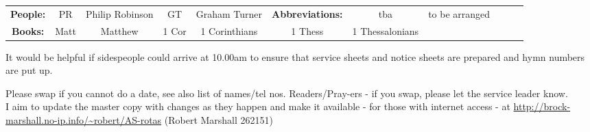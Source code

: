 \documentclass[10pt]{article}
\begin{document}
\begin{center}
\vspace{1em}
\begin{tabular}{|c|c|c|c|c|c|c|c|c|c|c|}\hline
{\bf People: } &
PR & Philip Robinson &
 GT & Graham Turner &    %
{\bf Abbreviations:}
& tba & to be arranged \\
 {\bf Books: } & Matt & Matthew  & 1 Cor & 1 Corinthians
& 1 Thess & 1 Thessalonians & \\ %
     \hline
  \end{tabular}
\end{center}
\begin{minipage}{0.7\textwidth}
{\footnotesize It would be helpful if sidespeople 
could arrive at 10.00am to ensure that service sheets and notice sheets are 
prepared and hymn numbers are put up.

Please swap if you cannot do a date, see also list of names/tel nos.
Readers/Pray-ers - if you swap, please let the service leader know.\\
I aim to update the master copy with changes as they
happen and make it available - for those with internet access
\linebreak - at
\url{http://brock-marshall.no-ip.info/~robert/AS-rotas}
(Robert Marshall 262151)}
\end{minipage}
\end{document}
